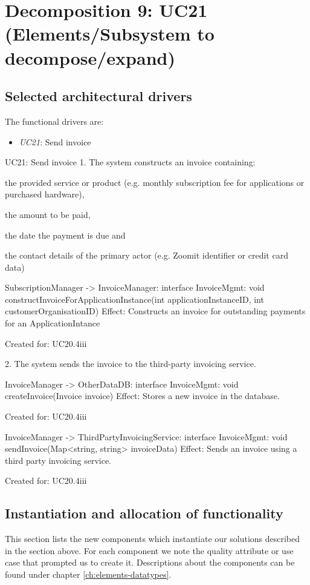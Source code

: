 \section{Decomposition 9: UC21 (Elements/Subsystem to decompose/expand)}


\subsection{Selected architectural drivers}
    The functional drivers are:
    \begin{itemize}
        \item \emph{UC21}: Send invoice
    \end{itemize}

    UC21: Send invoice
        1. The system constructs an invoice containing:
            { the provided service or product (e.g. monthly subscription fee for applications or purchased hardware),
            { the amount to be paid,
            { the date the payment is due and
            { the contact details of the primary actor (e.g. Zoomit identifier or credit card data)

                SubscriptionManager -> InvoiceManager: interface InvoiceMgmt: void constructInvoiceForApplicationInstance(int applicationInstanceID, int customerOrganisationID)
                    Effect: Constructs an invoice for outstanding payments for an ApplicationIntance
                    \item Created for: UC20.4iii

        2. The system sends the invoice to the third-party invoicing service.

            InvoiceManager -> OtherDataDB: interface InvoiceMgmt: void createInvoice(Invoice invoice)
                    Effect: Stores a new invoice in the database.
                    \item Created for: UC20.4iii

            InvoiceManager -> ThirdPartyInvoicingService: interface InvoiceMgmt: void sendInvoice(Map<string, string> invoiceData)
                    Effect: Sends an invoice using a third party invoicing service.
                    \item Created for: UC20.4iii


\subsection{Instantiation and allocation of functionality}
    This section lists the new components which instantiate our solutions
    described in the section above. For each component we note the quality
    attribute or use case that prompted us to create it. Descriptions about
    the components can be found under chapter \ref{ch:elements-datatypes}. \\

}}}}
